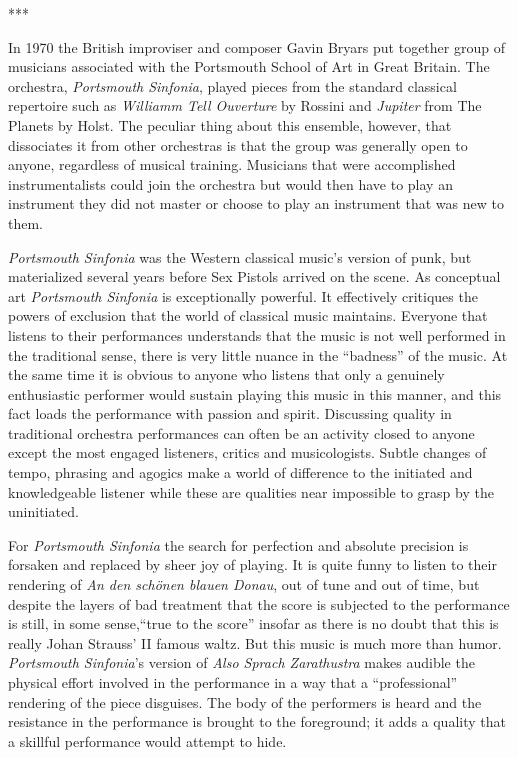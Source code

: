 \documentclass[11pt]{article}
\begin{document}
\vspace{0.4cm}
\begin{center}
  ***
\end{center}
\vspace{0.4cm}

In 1970 the British improviser and composer Gavin Bryars put together group of musicians associated with the Portsmouth School of Art in Great Britain. The orchestra, \emph{Portsmouth Sinfonia}, played pieces from the standard classical repertoire such as \emph{Williamm Tell Ouverture} by Rossini and \emph{Jupiter} from The Planets by Holst. The peculiar thing about this ensemble, however, that dissociates it from other orchestras is that the group was generally open to anyone, regardless of musical training. Musicians that were accomplished instrumentalists could join the orchestra but would then have to play an instrument they did not master or choose to play an instrument that was new to them.

\emph{Portsmouth Sinfonia} was the Western classical music's version of punk, but materialized several years before Sex Pistols arrived on the scene. As conceptual art \emph{Portsmouth Sinfonia} is exceptionally powerful. It effectively critiques the powers of exclusion that the world of classical music maintains. Everyone that listens to their performances understands that the music is not well performed in the traditional sense, there is very little nuance in the ``badness'' of the music. At the same time it is obvious to anyone who listens that only a genuinely enthusiastic performer would sustain playing this music in this manner, and this fact loads the performance with passion and spirit. Discussing quality in traditional orchestra performances can often be an activity closed to anyone except the most engaged listeners, critics and musicologists. Subtle changes of tempo, phrasing and agogics make a world of difference to the initiated and knowledgeable listener while these are qualities near impossible to grasp by the uninitiated.

For \emph{Portsmouth Sinfonia} the search for perfection and absolute precision is forsaken and replaced by sheer joy of playing. It is quite funny to listen to their rendering of \emph{An den schönen blauen Donau}, out of tune and out of time, but despite the layers of bad treatment that the score is subjected to the performance is still, in some sense,``true to the score'' insofar as there is no doubt that this is really Johan Strauss' II famous waltz. But this music is much more than humor. \emph{Portsmouth Sinfonia}'s version of \emph{Also Sprach Zarathustra} makes audible the physical effort involved in the performance in a way that a ``professional'' rendering of the piece disguises. The body of the performers is heard and the resistance in the performance is brought to the foreground; it adds a quality that a skillful performance would attempt to hide.
\end{document}
